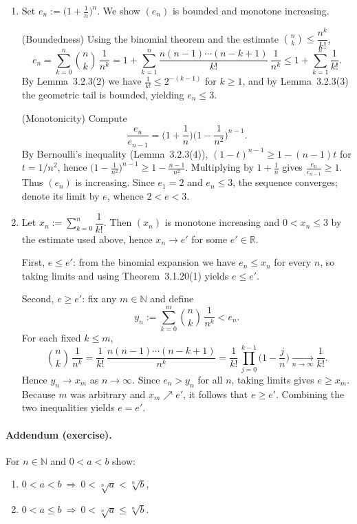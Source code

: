 \documentclass[12pt,a4paper]{article}
\newcommand{\N}{\mathbb{N}}
\newcommand{\R}{\mathbb{R}}
\theoremstyle{plain}
\theoremstyle{definition}
\theoremstyle{remark}
\begin{document}
\begin{enumerate}[label={(\arabic*)}, leftmargin=*]
			\item Set $e_n := \bigl(1+\tfrac{1}{n}\bigr)^{\!n}$. We show $(e_n)$ is bounded and monotone increasing.

			(Boundedness) Using the binomial theorem and the estimate $\binom{n}{k}\le \dfrac{n^k}{k!}$,
			\[
				e_n = \sum_{k=0}^{n} \binom{n}{k}\,\frac{1}{n^k}
						= 1 + \sum_{k=1}^{n} \frac{n(n-1)\cdots(n-k+1)}{k!}\,\frac{1}{n^k}
						\le 1 + \sum_{k=1}^{n} \frac{1}{k!}.
			\]
			By Lemma~3.2.3(2) we have $\tfrac{1}{k!}\le 2^{-(k-1)}$ for $k\ge1$, and by Lemma~3.2.3(3) the geometric tail is bounded, yielding $e_n\le 3$.

			(Monotonicity) Compute
			\[
				\frac{e_n}{e_{n-1}} = \Big(1+\frac{1}{n}\Big)\Big(1-\frac{1}{n^2}\Big)^{n-1}.
			\]
			By Bernoulli's inequality (Lemma~3.2.3(4)), $(1-t)^{n-1}\ge 1-(n-1)t$ for $t=1/n^2$, hence $\big(1-\tfrac{1}{n^2}\big)^{n-1}\ge 1-\tfrac{n-1}{n^2}$. Multiplying by $1+\tfrac{1}{n}$ gives $\tfrac{e_n}{e_{n-1}}\ge 1$. Thus $(e_n)$ is increasing. Since $e_1=2$ and $e_n\le 3$, the sequence converges; denote its limit by $e$, whence $2<e<3$.

			\item Let $x_n := \sum_{k=0}^{n} \dfrac{1}{k!}$. Then $(x_n)$ is monotone increasing and $0<x_n\le 3$ by the estimate used above, hence $x_n\to e'$ for some $e'\in\R$.

			First, $e\le e'$: from the binomial expansion we have $e_n\le x_n$ for every $n$, so taking limits and using Theorem~3.1.20(1) yields $e\le e'$.

			Second, $e\ge e'$: fix any $m\in\N$ and define
			\[
				y_n := \sum_{k=0}^{m} \binom{n}{k}\,\frac{1}{n^k} < e_n.
			\]
			For each fixed $k\le m$,
			\[
				\binom{n}{k}\,\frac{1}{n^k} = \frac{1}{k!}\,\frac{n(n-1)\cdots(n-k+1)}{n^k}
					= \frac{1}{k!}\,\prod_{j=0}^{k-1}\Big(1-\frac{j}{n}\Big)
					\xrightarrow[n\to\infty]{} \frac{1}{k!}.
			\]
			Hence $y_n\to x_m$ as $n\to\infty$. Since $e_n>y_n$ for all $n$, taking limits gives $e\ge x_m$. Because $m$ was arbitrary and $x_m\nearrow e'$, it follows that $e\ge e'$. Combining the two inequalities yields $e=e'$.
		\end{enumerate}

		\paragraph{Addendum (exercise).}
		For $n\in\N$ and $0<a<b$ show:
		\begin{enumerate}[label={(\arabic*)}, leftmargin=*]
			\item $0<a<b \ \Rightarrow\ 0<\sqrt[n]{a}<\sqrt[n]{b}$,
			\item $0<a\le b \ \Rightarrow\ 0<\sqrt[n]{a}\le \sqrt[n]{b}$.
		\end{enumerate}
\end{document}
